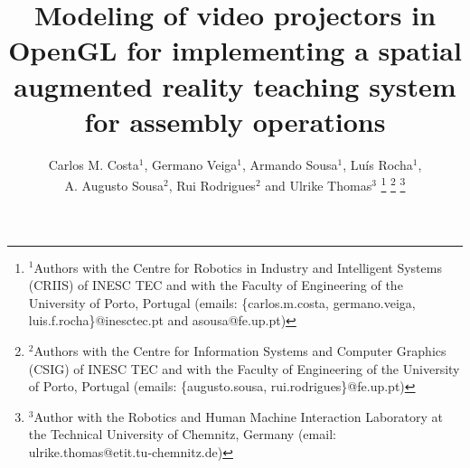 









\title{\LARGE \bf
Modeling of video projectors in OpenGL for implementing a spatial augmented reality teaching system for assembly operations
}

\author{Carlos M. Costa$^{1}$, Germano Veiga$^{1}$, Armando Sousa$^{1}$, Luís Rocha$^{1}$,\\A. Augusto Sousa$^{2}$, Rui Rodrigues$^{2}$ and Ulrike Thomas$^{3}$%
\thanks{$^{1}$Authors with the Centre for Robotics in Industry and Intelligent Systems (CRIIS) of INESC TEC and with the Faculty of Engineering of the University of Porto, Portugal (emails: \{carlos.m.costa, germano.veiga, luis.f.rocha\}@inesctec.pt and asousa@fe.up.pt)}%
\thanks{$^{2}$Authors with the Centre for Information Systems and Computer Graphics (CSIG) of INESC TEC and with the Faculty of Engineering of the University of Porto, Portugal (emails: \{augusto.sousa, rui.rodrigues\}@fe.up.pt)}%
\thanks{$^{3}$Author with the Robotics and Human Machine Interaction Laboratory at the Technical University of Chemnitz, Germany (email: ulrike.thomas@etit.tu-chemnitz.de)}%
}


\maketitle



















